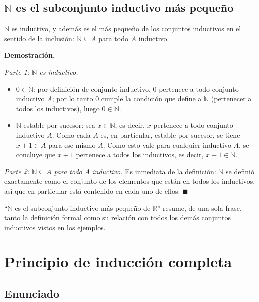 \documentclass[12pt,a4paper]{article}
\begin{document}
\subsection{$\mathbb{N}$ es el subconjunto inductivo más pequeño}

\begin{keybox}[Proposición]
$\mathbb{N}$ es inductivo, y además es el más pequeño de los conjuntos
inductivos en el sentido de la inclusión: $\mathbb{N} \subseteq A$ para
todo $A$ inductivo.
\end{keybox}

\textbf{Demostración.}

\emph{Parte 1: $\mathbb{N}$ es inductivo.}
\begin{itemize}
  \item $0 \in \mathbb{N}$: por definición de conjunto inductivo, $0$
    pertenece a todo conjunto inductivo $A$; por lo tanto $0$ cumple la
    condición que define a $\mathbb{N}$ (pertenecer a todos los
    inductivos), luego $0 \in \mathbb{N}$.
  \item $\mathbb{N}$ estable por sucesor: sea $x \in \mathbb{N}$, es decir,
    $x$ pertenece a todo conjunto inductivo $A$. Como cada $A$ es, en
    particular, estable por sucesor, se tiene $x+1 \in A$ para ese mismo
    $A$. Como esto vale para cualquier inductivo $A$, se concluye que $x+1$
    pertenece a todos los inductivos, es decir, $x + 1 \in \mathbb{N}$.
\end{itemize}

\emph{Parte 2: $\mathbb{N} \subseteq A$ para todo $A$ inductivo.} Es
inmediata de la definición: $\mathbb{N}$ se definió exactamente como el
conjunto de los elementos que están en todos los inductivos, así que en
particular está contenido en cada uno de ellos. $\blacksquare$

\begin{notebox}
``$\mathbb{N}$ es el subconjunto inductivo más pequeño de $\mathbb{R}$''
resume, de una sola frase, tanto la definición formal como su relación con
todos los demás conjuntos inductivos vistos en los ejemplos.
\end{notebox}

\section{Principio de inducción completa}

\subsection{Enunciado}
\end{document}
